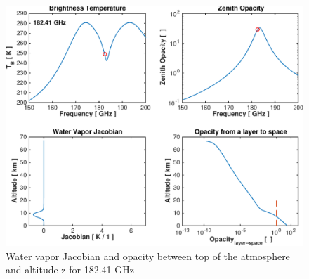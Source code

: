 \documentclass[paper=a4, fontsize=11pt]{scrartcl} %
\begin{document}
\begin{figure}[h]
\centering
	\includegraphics[width=\textwidth]{plots/jac_182GHz.pdf}
	\caption{Water vapor Jacobian and opacity between top of the atmosphere and altitude z for 182.41 GHz}
\end{figure}
\end{document}
